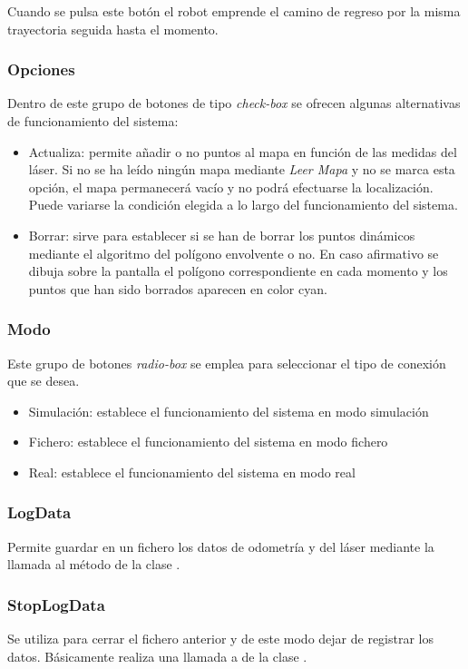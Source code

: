 Cuando se pulsa este botón el robot emprende el camino de regreso por la misma trayectoria seguida hasta el momento.

\subsubsection{Opciones}
Dentro de este grupo de botones de tipo \emph{check-box} se ofrecen algunas alternativas de funcionamiento del sistema:
\begin{itemize}
  \item Actualiza: permite añadir o no puntos al mapa en función de las medidas del láser. Si no se ha leído ningún mapa mediante \emph{Leer Mapa} y no se marca esta opción, el mapa permanecerá vacío y no podrá efectuarse la localización. Puede variarse la condición elegida a lo largo del funcionamiento del sistema.
  \item Borrar: sirve para establecer si se han de borrar los puntos dinámicos mediante el algoritmo del polígono envolvente o no. En caso afirmativo se dibuja sobre la pantalla el polígono correspondiente en cada momento y los puntos que han sido borrados aparecen en color cyan.
\end{itemize}

\subsubsection{Modo}
Este grupo de botones \emph{radio-box} se emplea para seleccionar el tipo de conexión que se desea.
\begin{itemize}
  \item Simulación: establece el funcionamiento del sistema en modo simulación
  \item Fichero: establece el funcionamiento del sistema en modo fichero
  \item Real: establece el funcionamiento del sistema en modo real
\end{itemize}

\subsubsection{LogData}
Permite guardar en un fichero los datos de odometría y del láser mediante la llamada al método  de la clase .

\subsubsection{StopLogData}
Se utiliza para cerrar el fichero anterior y de este modo dejar de registrar los datos. Básicamente realiza una llamada a  de la clase .

